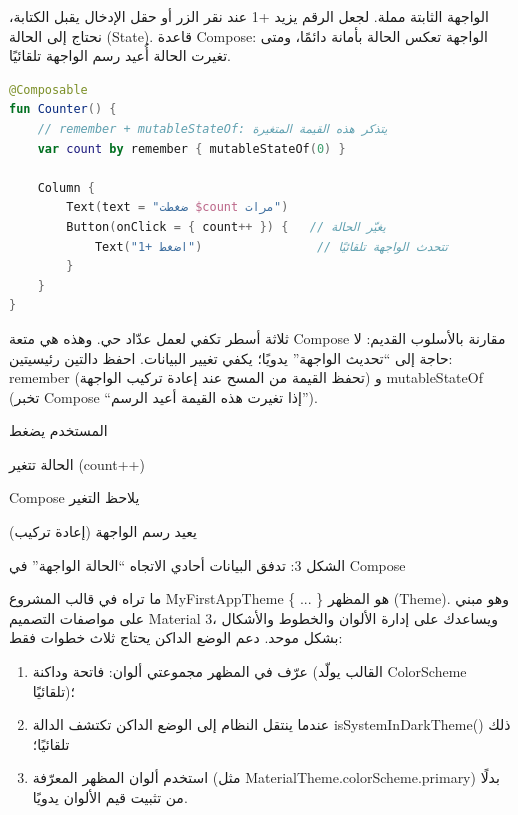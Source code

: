 
الواجهة الثابتة مملة. لجعل الرقم يزيد +1 عند نقر الزر أو حقل الإدخال يقبل الكتابة، نحتاج إلى الحالة (State). قاعدة Compose: الواجهة تعكس الحالة بأمانة دائمًا، ومتى تغيرت الحالة أُعيد رسم الواجهة تلقائيًا.

\begin{lstlisting}[language=Kotlin]
@Composable
fun Counter() {
    // ‏remember + mutableStateOf: يتذكر هذه القيمة المتغيرة
    var count by remember { mutableStateOf(0) }

    Column {
        Text(text = "ضغطت $count مرات")
        Button(onClick = { count++ }) {   // يغيّر الحالة
            Text("اضغط +1")                // تتحدث الواجهة تلقائيًا
        }
    }
}
\end{lstlisting}

ثلاثة أسطر تكفي لعمل عدّاد حي. وهذه هي متعة Compose مقارنة بالأسلوب القديم: لا حاجة إلى “تحديث الواجهة” يدويًا؛ يكفي تغيير البيانات. احفظ دالتين رئيسيتين: remember (تحفظ القيمة من المسح عند إعادة تركيب الواجهة) و mutableStateOf (تخبر Compose “إذا تغيرت هذه القيمة أعيد الرسم”).

المستخدم يضغط

الحالة تتغير (count++)

Compose يلاحظ التغير

يعيد رسم الواجهة (إعادة تركيب)

\begin{center}\small\color{gray}الشكل 3: تدفق البيانات أحادي الاتجاه “الحالة الواجهة” في Compose\end{center}


ما تراه في قالب المشروع MyFirstAppTheme \{ ... \} هو المظهر (Theme). وهو مبني على مواصفات التصميم Material 3، ويساعدك على إدارة الألوان والخطوط والأشكال بشكل موحد. دعم الوضع الداكن يحتاج ثلاث خطوات فقط:

\begin{enumerate}
  \item عرّف في المظهر مجموعتي ألوان: فاتحة وداكنة (القالب يولّد ColorScheme تلقائيًا)؛
  \item عندما ينتقل النظام إلى الوضع الداكن تكتشف الدالة isSystemInDarkTheme() ذلك تلقائيًا؛
  \item استخدم ألوان المظهر المعرّفة (مثل MaterialTheme.colorScheme.primary) بدلًا من تثبيت قيم الألوان يدويًا.
\end{enumerate}

